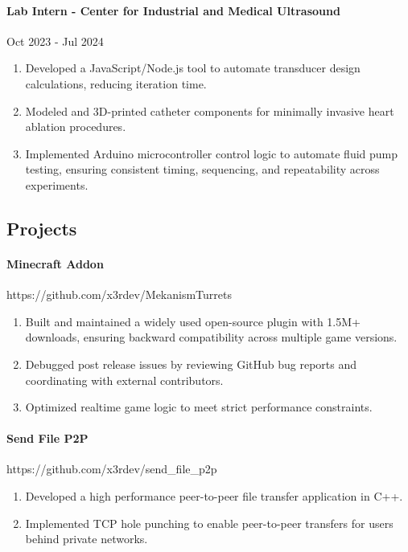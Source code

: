 \documentclass{article}
\begin{document}
\paragraph{Lab Intern - Center for Industrial and Medical Ultrasound} \hfill Oct 2023 - Jul 2024
\begin{enumerate}[label=$\bullet$]
    \item Developed a JavaScript/Node.js tool to automate transducer design calculations, reducing iteration time.
    \item Modeled and 3D-printed catheter components for minimally invasive heart ablation procedures.
    \item Implemented Arduino microcontroller control logic to automate fluid pump testing, ensuring consistent timing, sequencing, and repeatability across experiments.
\end{enumerate}\vspace{-1.25em}

\subsection*{Projects}\vspace{-0.75em}\hrulefill\vspace{-1em}
 
\paragraph{Minecraft Addon}\hfill https://github.com/x3rdev/MekanismTurrets
\begin{enumerate}[label=$\bullet$]
    \item Built and maintained a widely used open-source plugin with 1.5M+ downloads, ensuring backward compatibility across multiple game versions.
    \item Debugged post release issues by reviewing GitHub bug reports and coordinating with external contributors.
    \item Optimized realtime game logic to meet strict performance constraints.
\end{enumerate}\vspace{-1em}

\paragraph{Send File P2P}\hfill https://github.com/x3rdev/send\_file\_p2p
\begin{enumerate}[label=$\bullet$]
    \item Developed a high performance peer-to-peer file transfer application in C++.
    \item Implemented TCP hole punching to enable peer-to-peer transfers for users behind private networks.
\end{enumerate}\vspace{-1em}
\end{document}
